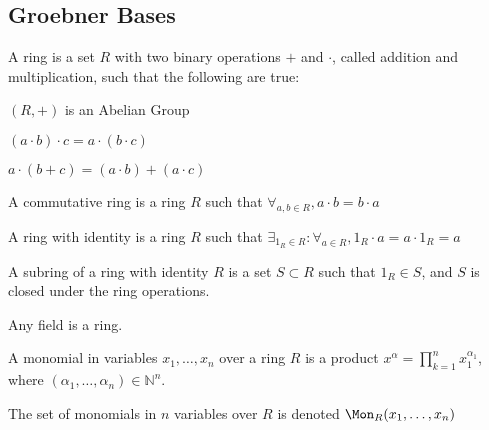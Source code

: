 \documentclass[crop=false,class=book,oneside]{standalone}
\begin{document}
        \subsection{Groebner Bases}
            \begin{definition}
                A ring is a set $R$ with two binary operations $+$
                and $\cdot$, called addition and multiplication,
                such that the following are true:
                \begin{enumerate}
                    \begin{multicols}{3}
                        \item $(R,+)$ is an Abelian Group
                        \item $(a\cdot{b})\cdot{c}=a\cdot(b\cdot{c})$
                        \item $a\cdot(b+c)=(a\cdot b)+(a\cdot c)$
                    \end{multicols}
                \end{enumerate}
            \end{definition}
            \begin{definition}
                A commutative ring is a ring $R$ such that
                $\forall_{a,b\in R},a\cdot{b}=b\cdot{a}$
            \end{definition}
            \begin{definition}
                A ring with identity is a ring $R$ such that
                $\exists_{1_{R}\in R}:\forall_{a\in R}, 1_{R}\cdot a=a\cdot 1_{R}=a$
            \end{definition}
            \begin{definition}
                A subring of a ring with identity $R$ is a set
                $S\subset R$ such that $1_{R}\in S$, and $S$ is
                closed under the ring operations.
            \end{definition}
            \begin{remark}
                Any field is a ring.
            \end{remark}
            \begin{definition}
                A monomial in variables $x_1,\hdots, x_n$ over a
                ring $R$ is a product
                $x^\alpha=\prod_{k=1}^{n} x_1^{\alpha_1}$,
                where $(\alpha_1,\hdots,\alpha_n)\in \mathbb{N}^n$.
            \end{definition}
            \begin{notation}
                The set of monomials in $n$ variables over
                $R$ is denoted $\Mon_{R}(x_1,\hdots, x_n)$
            \end{notation}
\end{document}
